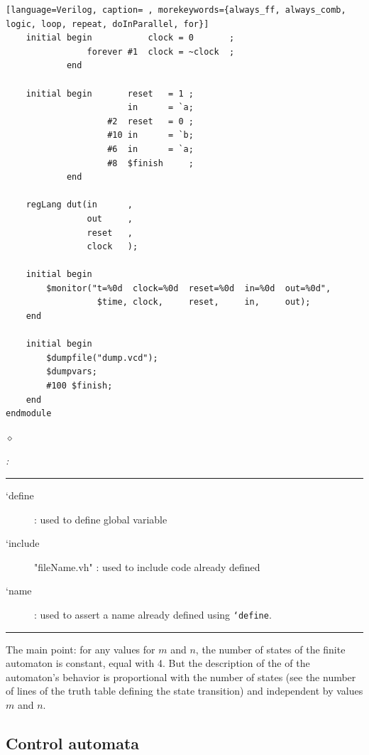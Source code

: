 \begin{exemplu}
{{\begin{shaded*}
\begin{lstlisting}[language=Verilog, caption= , morekeywords={always_ff, always_comb, logic, loop, repeat, doInParallel, for}]
    initial begin           clock = 0       ;
                forever #1  clock = ~clock  ;
            end

    initial begin       reset   = 1 ;
                        in      = `a;
                    #2  reset   = 0 ;
                    #10 in      = `b;
                    #6  in      = `a;
                    #8  $finish     ;
            end

    regLang dut(in      ,
                out     ,
                reset   ,
                clock   );

    initial begin
        $monitor("t=%0d  clock=%0d  reset=%0d  in=%0d  out=%0d",
                  $time, clock,     reset,     in,     out);
    end

    initial begin
        $dumpfile("dump.vcd");
        $dumpvars;
        #100 $finish;
    end
endmodule
\end{lstlisting}
\end{shaded*}
}}



$\diamond$
\end{exemplu}

\begin{verisum}{\em :

\hspace{-0.8cm} \rule[5mm]{16cm}{0.25mm} \vspace{-0.7cm}

\begin{description}
    \item[`define]: used to define global variable
    \item[`include] "fileName.vh" : used to include code already defined
    \item[`name]: used to assert a name already defined using {\tt `define}.
\end{description}
\rule[5mm]{16cm}{0.25mm} }
\end{verisum}

The main point: for any values for $m$ and $n$, the number of states of the finite automaton is constant, equal with 4. But the description of the of the automaton's behavior is proportional with the number of states (see the number of lines of the truth table defining the state transition) and independent by values $m$ and $n$.

\subsection{Control automata}\label{contrAut}

